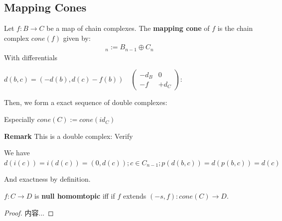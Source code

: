 \documentclass[Total.tex]{subfiles}
\begin{document}
			\subsection{Mapping Cones}
			\begin{Def}
				Let $f:B\rightarrow C$ be a map of chain complexes. The \textbf{mapping cone} of $f$ is the chain complex $cone(f)$ given by:
				\begin{gather*}
					[cone(f)]_n:=B_{n-1}\oplus C_n
				\end{gather*}
				With differentials
				\begin{center}
					$d(b,c)=(-d(b),d(c)-f(b))\quad\begin{pmatrix}
						-d_B&0\\
						-f&+d_C
					\end{pmatrix}:$
				\end{center}
				Then, we form a exact sequence of double complexes:
				\begin{center}
				\end{center}
			\end{Def}
			
			Especially $cone(C):=cone(id_C)$
			
			\textbf{Remark} This is a double complex: Verify
			\begin{center}
			\end{center}
			We have $d(i(c))=i(d(c))=(0,d(c));c\in C_{n-1};p(d(b,c))=d(p(b,c))=d(c)$
			
			And exactness by definition.
			\begin{proposition}
				$f:C\rightarrow D$ is \textbf{null homomtopic} iff if $f$ extends $(-s,f):cone(C)\rightarrow D$.
			\end{proposition}
			\begin{proof}
				内容...
			\end{proof}
			
\end{document}
